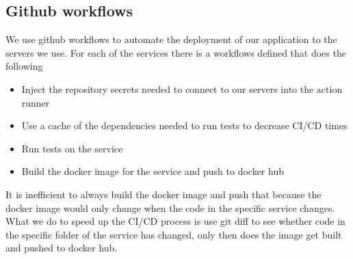 \documentclass[12pt]{article}
\begin{document}
\subsection{Github workflows}
    We use github workflows to automate the deployment of our application to the servers we use.
    \newline For each of the services there is a workflows defined that does the following
    \begin{itemize}
        \item Inject the repository secrets needed to connect to our servers into the action runner
        \item Use a cache of the dependencies needed to run tests to decrease CI/CD times
        \item Run tests on the service
        \item Build the docker image for the service and push to docker hub
    \end{itemize}
    It is inefficient to always build the docker image and push that because the docker image would only change when the code in the specific service changes.
    \newline What we do to speed up the CI/CD process is use git diff to see whether code in the specific folder of the service has changed, only then does the image get built and pushed to docker hub.
    \newpage
\end{document}
